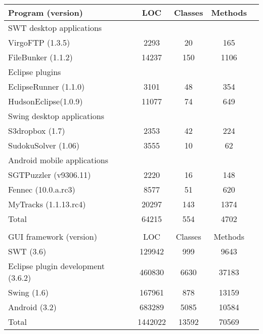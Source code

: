 \begin{table}[t]
\begin{center}
 \fontsize{9pt}{\baselineskip}\selectfont
\hspace*{-0.2cm}
\setlength{\tabcolsep}{.70\tabcolsep}
\begin{tabular}{|p{4.4cm}||c|c|c|c|}
\hline
 Program (version) & LOC & Classes & Methods \\
\hline \hline
\multicolumn{4}{|l|}{SWT desktop applications}   \\
 \hline
 VirgoFTP (1.3.5) &  2293 &  20 &  165  \\
 \hline
 FileBunker (1.1.2)&  14237 &  150 &  1106  \\
 \hline
 \hline
\multicolumn{4}{|l|}{Eclipse plugins}   \\
 \hline
 EclipseRunner (1.1.0) &  3101 &  48 &  354\\
 \hline
 HudsonEclipse(1.0.9)&  11077 &  74 &  649 \\
 \hline
 \hline
\multicolumn{4}{|l|}{Swing desktop applications}   \\
 \hline
 S3dropbox (1.7) &  2353 &  42  &  224 \\
 \hline
 SudokuSolver (1.06)&  3555 &  10 &  62 \\
 \hline
 \hline
\multicolumn{4}{|l|}{Android mobile applications}   \\
 \hline
 SGTPuzzler (v9306.11)&  2220 &  16 &  148 \\
 \hline
 Fennec (10.0.a.rc3)&  8577 &  51 &  620 \\
 \hline
 MyTracks (1.1.13.rc4)&  20297 &  143 &  1374 \\
\hline
\hline
 Total &  64215 &  554 &  4702 \\
\hline
\multicolumn{4}{l}{}   \\
\hline
 GUI framework (version) & LOC & Classes & Methods  \\
\hline \hline
 SWT (3.6)&  129942 &  999 &  9643 \\
\hline
 Eclipse plugin development (3.6.2)&  460830 &  6630 &  37183 \\
\hline
Swing (1.6)&  167961 &  878 &  13159 \\
\hline
 Android (3.2)&  683289 &  5085 &  10584 \\
\hline
\hline
 Total &  1442022 &  13592 &  70569\\
\hline
\end{tabular}

\end{center}
\vspace{-15pt}
\end{table}


